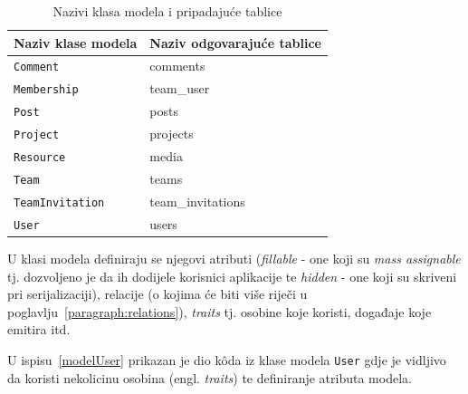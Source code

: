 \begin{longtable}{ll}
\caption{Nazivi klasa modela i pripadajuće tablice}\label{fig:namingModelTable}
\endfirsthead
\endhead
\hline
Naziv klase modela&Naziv odgovarajuće tablice\\
\hline
\lstinline!Comment!&comments\\
\lstinline!Membership!&team\_user\\
\lstinline!Post!&posts\\
\lstinline!Project!&projects\\
\lstinline!Resource!&media\\
\lstinline!Team!&teams\\
\lstinline!TeamInvitation!&team\_invitations\\
\lstinline!User!&users\\
\hline
\end{longtable}

U klasi modela definiraju se njegovi atributi (\textit{fillable} - one koji su \textit{mass assignable} tj. dozvoljeno je da ih dodijele korisnici aplikacije te \textit{hidden} - one koji su skriveni pri serijalizaciji), relacije (o kojima će biti više riječi u poglavlju~\ref{paragraph:relations}), \textit{traits} tj. osobine koje koristi, događaje koje emitira itd.

U ispisu~\ref{modelUser} prikazan je dio k\^oda iz klase modela \texttt{User} gdje je vidljivo da koristi nekolicinu osobina (engl. \textit{traits}) te definiranje atributa modela.

